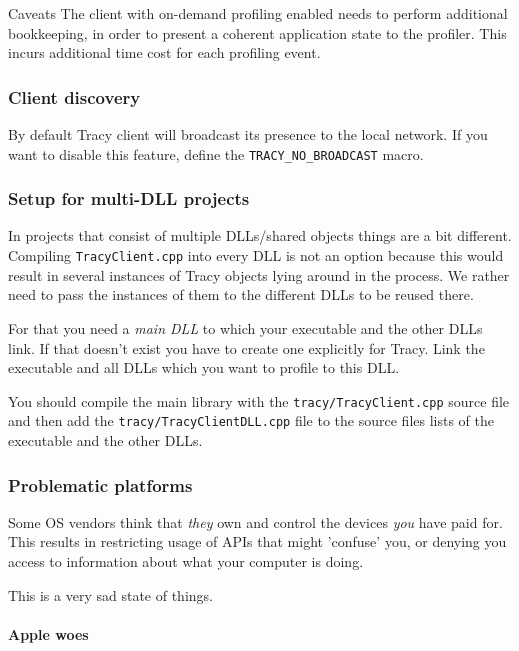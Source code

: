 \documentclass[hidelinks,titlepage,a4paper]{article}
\begin{document}
\begin{bclogo}[
noborder=true,
couleur=black!5,
logo=\bcattention
]{Caveats}
The client with on-demand profiling enabled needs to perform additional bookkeeping, in order to present a coherent application state to the profiler. This incurs additional time cost for each profiling event.
\end{bclogo}

\subsubsection{Client discovery}

By default Tracy client will broadcast its presence to the local network. If you want to disable this feature, define the \texttt{TRACY\_NO\_BROADCAST} macro.

\subsubsection{Setup for multi-DLL projects}

In projects that consist of multiple DLLs/shared objects things are a bit different. Compiling \texttt{TracyClient.cpp} into every DLL is not an option because this would result in several instances of Tracy objects lying around in the process. We rather need to pass the instances of them to the different DLLs to be reused there.

For that you need a \emph{main DLL} to which your executable and the other DLLs link. If that doesn't exist you have to create one explicitly for Tracy. Link the executable and all DLLs which you want to profile to this DLL.

You should compile the main library with the \texttt{tracy/TracyClient.cpp} source file and then add the \texttt{tracy/TracyClientDLL.cpp} file to the source files lists of the executable and the other DLLs.

\subsubsection{Problematic platforms}

Some OS vendors think that \emph{they} own and control the devices \emph{you} have paid for. This results in restricting usage of APIs that might 'confuse' you, or denying you access to information about what your computer is doing.

This is a very sad state of things.

\paragraph{Apple woes}
\end{document}
